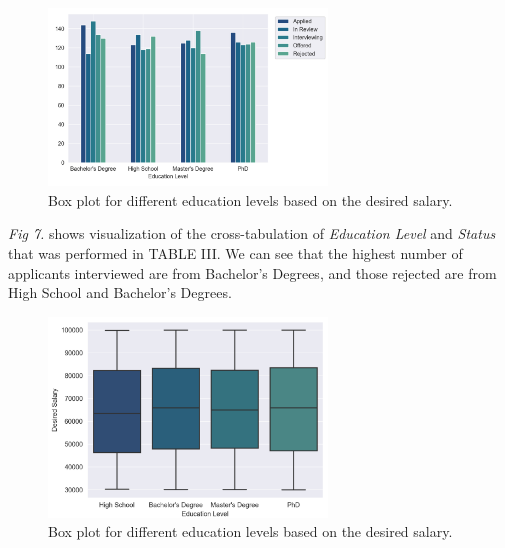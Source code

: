 \documentclass[journal]{IEEEtai}
\begin{document}
\begin{figure}[htbp]
\centerline{\includegraphics[width=17.5pc]{figures/educationlevelandstatusN.png}}
\caption{Box plot for different education levels based on the desired salary.}
\end{figure}

{\it Fig 7.} shows visualization of the cross-tabulation of {\it Education Level} and {\it Status} that was performed in TABLE III. We can see that the highest number of applicants interviewed are from Bachelor’s Degrees, and those rejected are from High School and Bachelor’s Degrees.


\begin{figure}[htbp]
\centerline{\includegraphics[width=17.5pc]{figures/box-whisker.png}}
\caption{Box plot for different education levels based on the desired salary.}
\end{figure}
\end{document}
